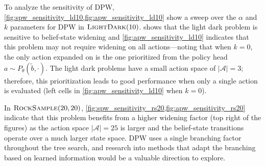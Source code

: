 To analyze the sensitivity of DPW, \cref{fig:spw_sensitivity_ld10,fig:apw_sensitivity_ld10} show a sweep over the $\alpha$ and $k$ parameters for DPW in $\textsc{LightDark}(10)$.
 shows that the light dark problem is sensitive to belief-state widening and \cref{fig:apw_sensitivity_ld10} indicates that this problem may not require widening on all actions---noting that when $k=0$, the only action expanded on is the one prioritized from the policy head $a\sim P_\theta(\tilde{b}, \cdot)$.
The light dark problems have a small action space of ${|\mathcal{A}|=3}$; therefore, this prioritization leads to good performance when only a single action is evaluated (left cells in \cref{fig:apw_sensitivity_ld10} when $k=0$).

In $\textsc{RockSample}(20,20)$, \cref{fig:spw_sensitivity_rs20,fig:apw_sensitivity_rs20} indicate that this problem benefits from a higher widening factor (top right of the figures) as the action space ${|\mathcal{A}|=25}$ is larger and the belief-state transitions operate over a much larger state space.
DPW uses a single branching factor throughout the tree search, and research into methods that adapt the branching based on learned information would be a valuable direction to explore.


